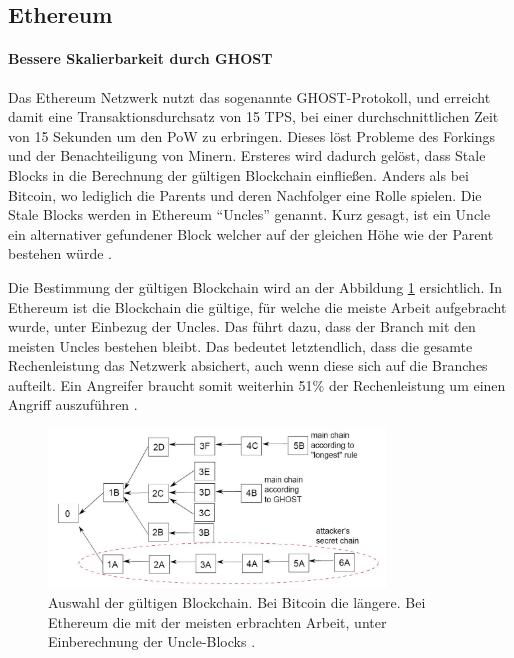 \subsection{Ethereum}

\paragraph{Bessere Skalierbarkeit durch GHOST}
Das Ethereum Netzwerk nutzt das sogenannte GHOST-Protokoll, und erreicht damit eine Transaktionsdurchsatz von 15 TPS, bei einer durchschnittlichen Zeit von 15 Sekunden um den PoW zu erbringen. Dieses löst Probleme des Forkings und der Benachteiligung von Minern. Ersteres wird dadurch gelöst, dass Stale Blocks in die Berechnung der gültigen Blockchain einfließen. Anders als bei Bitcoin, wo lediglich die Parents und deren Nachfolger eine Rolle spielen. Die Stale Blocks werden in Ethereum ``Uncles'' genannt. Kurz gesagt, ist ein Uncle ein alternativer gefundener Block welcher auf der gleichen Höhe wie der Parent bestehen würde \cite{EthereumTeamEthereumWhitePaper2017}.

Die Bestimmung der gültigen Blockchain wird an der Abbildung \ref{fig:forking-risks} ersichtlich. In Ethereum ist die Blockchain die gültige, für welche die meiste Arbeit aufgebracht wurde, unter Einbezug der Uncles. Das führt dazu, dass der Branch mit den meisten Uncles bestehen bleibt. Das bedeutet letztendlich, dass die gesamte Rechenleistung das Netzwerk absichert, auch wenn diese sich auf die Branches aufteilt. Ein Angreifer braucht somit weiterhin 51\% der Rechenleistung um einen Angriff auszuführen \cite{SompolinskyAcceleratingBitcoinTransaction2013}.

\begin{figure}[!htbp]
  \centering
    \includegraphics[width=0.8\textwidth,angle=0]{images/forking-risks}
     \caption{Auswahl der gültigen Blockchain. Bei Bitcoin die längere. Bei Ethereum die mit der meisten erbrachten Arbeit, unter Einberechnung der Uncle-Blocks \cite{SompolinskyAcceleratingBitcoinTransaction2013}.}
    \label{fig:forking-risks}
\end{figure} 

